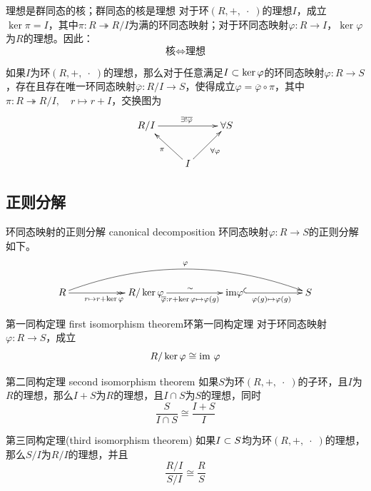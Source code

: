 \begin{theorem}{理想是群同态的核；群同态的核是理想}
	对于环$(R,+,\;\cdot\;)$的理想$I$，成立$\ker\pi=I$，其中$\pi:R\twoheadrightarrow R/I$为满的环同态映射；对于环同态映射$\varphi:R\to I$，$\ker\varphi$为$R$的理想。因此：
	$$
	\text{核}\iff\text{理想}
	$$
\end{theorem}

\begin{theorem}
	如果$I$为环$(R,+,\;\cdot\;)$的理想，那么对于任意满足$I\subset\ker\varphi$的环同态映射$\varphi:R\to S$，存在且存在唯一环同态映射$\overline{\varphi}:R/I\to S$，使得成立$\varphi=\overline{\varphi}\circ\pi$，其中$\pi:R\twoheadrightarrow R/I,\quad r\mapsto r+I$，交换图为
	$$
	\xymatrix{
		R/I \ar^{\exists!\overline{\varphi}}[rr]& &\forall S\\
		& I \ar[ul]^{\pi} \ar[ur]_{\forall\varphi} &
	}
	$$
\end{theorem}

\subsection{正则分解}

\begin{definition}{环同态映射的正则分解 canonical decomposition}
	环同态映射$\varphi:R\to S$的正则分解如下。
	$$
	\xymatrix@=13ex{
		R \ar@/^2pc/[rrr]^{\varphi} \ar@{->>}[r]_{r\mapsto r+\ker\varphi} & R/\ker\varphi \ar@{->}[r]_{\overline{\varphi}:r+\ker\varphi\mapsto \varphi(g)}^{\sim} & \mathrm{im}\varphi \ar@{^{(}->}[r]_{\varphi(g)\mapsto \varphi(g)} & S
	}
	$$
\end{definition}

\begin{theorem}{第一同构定理 first isomorphism theorem}{环第一同构定理}
	对于环同态映射$\varphi:R\to S$，成立
	$$
	R/\ker\varphi \cong \text{im } \varphi
	$$
\end{theorem}

\begin{theorem}{第二同构定理 second isomorphism theorem}
	如果$S$为环$(R,+,\;\cdot\;)$的子环，且$I$为$R$的理想，那么$I+S$为$R$的理想，且$I\cap S$为$S$的理想，同时
	$$
	\frac{S}{I\cap S}\cong\frac{I+S}{I}
	$$
\end{theorem}

\begin{theorem}{第三同构定理(third isomorphism theorem)}
	如果$I\subset S$均为环$(R,+,\;\cdot\;)$的理想，那么$S/I$为$R/I$的理想，并且
	$$
	\frac{R/I}{S/I}\cong \frac{R}{S}
	$$
\end{theorem}

